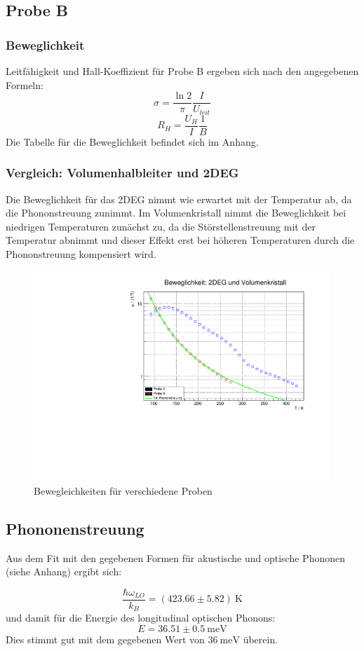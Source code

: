 \subsection{Probe B}
\subsubsection{Beweglichkeit}
\FloatBarrier
Leitfähigkeit und Hall-Koeffizient für Probe B ergeben sich nach den angegebenen Formeln:
$$\sigma = \frac{\ln 2}{\pi} \frac{I}{U_{leit}}$$
$$R_H = \frac{U_H}{I} \frac{1}{B}$$
Die Tabelle für die Beweglichkeit befindet sich im Anhang.

\FloatBarrier
\subsubsection{Vergleich: Volumenhalbleiter und 2DEG}

Die Beweglichkeit für das 2DEG nimmt wie erwartet mit der Temperatur ab, da die Phononstreuung zunimmt. Im Volumenkristall nimmt die Beweglichkeit bei niedrigen Temperaturen zunächst zu, da die Störstellenstreuung mit der Temperatur abnimmt und dieser Effekt erst bei höheren Temperaturen durch die Phononstreuung kompensiert wird.

\begin{figure}
\label{fig:bbew}
\centering
\includegraphics[scale = 0.5]{../data/B2.pdf}
\caption{Bewegleichkeiten für verschiedene Proben}
\end{figure}

\pagebreak

\FloatBarrier
\subsection{Phononenstreuung}

Aus dem Fit mit den gegebenen Formen für akustische und optische Phononen (siehe Anhang) ergibt sich:

$$\frac{\hbar \omega_{LO}}{k_B} = (423.66  \pm 5.82)\ \text{K}$$
und damit für die Energie des longitudinal optischen Phonons:
$$E = 36.51 \pm 0.5\ \text{meV}$$
Dies stimmt gut mit dem gegebenen Wert von $ 36 \ \text{meV} $ überein.




